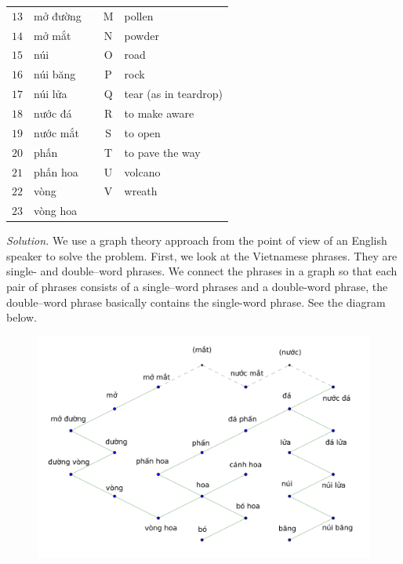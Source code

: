 \begin{multicols}{2}
\begin{table}[H]
{\begin{tabular}{|c|l|c|c|l|}
				$13$ & mở đường   &  & M & pollen                              \\ \cline{1-2} \cline{4-5} 
				$14$ & mở mắt     &  & N & powder                              \\ \cline{1-2} \cline{4-5} 
				$15$ & núi        &  & O & road                                \\ \cline{1-2} \cline{4-5} 
				$16$ & núi băng   &  & P & rock                                \\ \cline{1-2} \cline{4-5} 
				$17$ & núi lửa    &  & Q & tear (as in teardrop)               \\ \cline{1-2} \cline{4-5} 
				$18$ & nước đá    &  & R & to make aware                       \\ \cline{1-2} \cline{4-5} 
				$19$ & nước mắt   &  & S & to open                             \\ \cline{1-2} \cline{4-5} 
				$20$ & phấn       &  & T & to pave the way                     \\ \cline{1-2} \cline{4-5} 
				$21$ & phấn hoa   &  & U & volcano                             \\ \cline{1-2} \cline{4-5} 
				$22$ & vòng       &  & V & wreath                              \\ \cline{1-2} \cline{4-5} 
				$23$ & vòng hoa   &  &   &                                     \\ \cline{1-2} \cline{4-5} 
		\end{tabular}}
		\vspace*{-10pt}
	\end{table}
\textit{Solution.}
We use a graph theory approach from the point of view of an English speaker to solve the problem.
\vskip 0.1cm
First, we look at the Vietnamese phrases. They are single- and double--word phrases.
We connect the phrases in a graph so that each pair of phrases consists of a single--word phrases and a double-word phrase,
the double--word phrase basically contains the single-word phrase. See the diagram below.
\begin{figure}[H]
	\vspace*{-5pt}
	\centering
	\captionsetup{labelformat= empty, justification=centering}
	\includegraphics[width= 1\linewidth]{hc-2022-2-2-2-1.pdf}

\end{figure}
\end{multicols}
